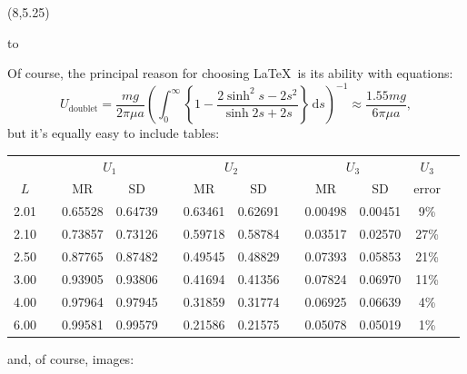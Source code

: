\documentclass[a0]{a0poster}
\newcommand{\ds}{\mathrm{d}s}
\def\Head#1{\noindent\hbox to \hsize{\hfil{\LARGE\color{DarkBlue}\sf #1}}\bigskip}
\begin{document}
\begin{textblock}{7}(8,5.25)

\Head{Evaluation}

\sf
Of course, the principal reason for choosing \LaTeX\ is its ability with equations:  
\[ 
   U_\mathrm{doublet} = \frac{mg}{2\pi\mu a}\left( \int_0^\infty \left\{ 1
       - \frac{2\sinh^2{s} - 2s^2}{\sinh{2s}+2s}\right\}\,\ds
   \right)^{-1} \approx \frac{1.55mg}{6\pi\mu a}, \] 
but it's equally easy to include tables: 
\begin{center} 
\begin{tabular}{cccccccccccr}
\hline
  && \multicolumn{2}{c}{$U_1$}  && \multicolumn{2}{c}{$U_2$} 
  && \multicolumn{2}{c}{$U_3$} & $U_3$ \\ 
$L$ &&    MR   &   SD   &&   MR   &   SD   &&   MR    &   SD & error \\ 
\hline
2.01 &&0.65528 &0.64739 &&0.63461 &0.62691 &&0.00498 &0.00451 & 9\%\\ 
2.10 &&0.73857 &0.73126 &&0.59718 &0.58784 &&0.03517 &0.02570 &27\%\\ 
2.50 &&0.87765 &0.87482 &&0.49545 &0.48829 &&0.07393 &0.05853 &21\%\\ 
3.00 &&0.93905 &0.93806 &&0.41694 &0.41356 &&0.07824 &0.06970 &11\%\\ 
4.00 &&0.97964 &0.97945 &&0.31859 &0.31774 &&0.06925 &0.06639 & 4\%\\ 
6.00 &&0.99581 &0.99579 &&0.21586 &0.21575 &&0.05078 &0.05019 & 1\%\\ 
\hline
\end{tabular} 
\end{center}
and, of course, images:
\begin{center}

\end{center}
\end{textblock}
\end{document}
